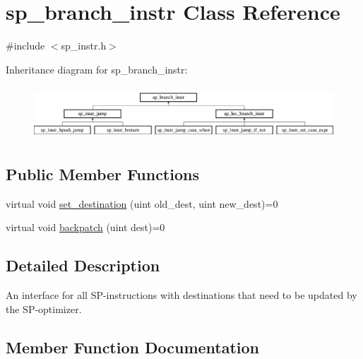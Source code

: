 \hypertarget{classsp__branch__instr}{}\section{sp\+\_\+branch\+\_\+instr Class Reference}
\label{classsp__branch__instr}


{\ttfamily \#include $<$sp\+\_\+instr.\+h$>$}

Inheritance diagram for sp\+\_\+branch\+\_\+instr\+:\begin{figure}[H]
\begin{center}
\leavevmode
\includegraphics[height=2.000000cm]{classsp__branch__instr}
\end{center}
\end{figure}
\subsection*{Public Member Functions}
\begin{DoxyCompactItemize}
\item 
virtual void \mbox{\hyperlink{classsp__branch__instr_ad5bc8e2fede785323c1749b6269869c3}{set\+\_\+destination}} (uint old\+\_\+dest, uint new\+\_\+dest)=0
\item 
virtual void \mbox{\hyperlink{classsp__branch__instr_a10bd06254e30634e367405f0fba5ab0d}{backpatch}} (uint dest)=0
\end{DoxyCompactItemize}


\subsection{Detailed Description}
An interface for all SP-\/instructions with destinations that need to be updated by the SP-\/optimizer. 

\subsection{Member Function Documentation}
\mbox{\label{classsp__branch__instr_a10bd06254e30634e367405f0fba5ab0d}} 
